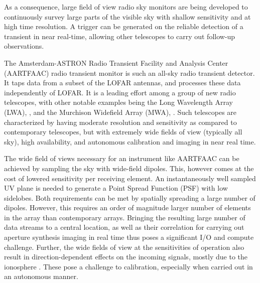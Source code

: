 \documentclass{ws-jai}
\begin{document}
As a consequence, large field of view  radio sky monitors are being developed to
continuously survey large parts of the  visible sky with shallow sensitivity and
at high time  resolution.  A trigger can be generated  on the reliable detection
of  a transient  in  near  real-time, allowing  other  telescopes  to carry  out
follow-up observations.


The  Amsterdam-ASTRON Radio  Transient Facility  and Analysis  Center (AARTFAAC)
radio transient  monitor is such  an all-sky  radio transient detector.  It taps
data from a subset of the LOFAR antennas, and processes these data independently
of LOFAR.  It  is a leading effort  among a group of new  radio telescopes, with
other   notable    examples   being    the   Long   Wavelength    Array   (LWA),
\cite{ellingsonLWA1},   and  the   Murchison   Widefield   Array  (MWA),   \cite
     {tingay2013murchison}.   Such   telescopes  are  characterized   by  having
     moderate resolution and sensitivity as compared to contemporary telescopes,
     but  with  extremely  wide  fields   of  view  (typically  all  sky),  high
     availability, and autonomous calibration and imaging in near real time.

The  wide field  of  views necessary  for  an instrument  like  AARTFAAC can  be
achieved by sampling the sky with wide-field dipoles. This, however comes at the
cost  of lowered  sensitivity per  receiving element.   An instantaneously  well
sampled UV plane  is needed to generate  a Point Spread Function  (PSF) with low
sidelobes.  Both requirements  can be met by spatially spreading  a large number
of  dipoles.  However,  this requires  an order  of magnitude  larger number  of
elements in  the array than  contemporary arrays.  Bringing the  resulting large
number of data streams  to a central location, as well  as their correlation for
carrying out  aperture synthesis imaging in  real time thus poses  a significant
I/O and compute challenge. Further, the wide fields of view at the sensitivities
of operation also result in direction-dependent effects on the incoming signals,
mostly              due              to              the              ionosphere
\citep{intema2009ionospheric,wijnholds2010calibration}.  These  pose a challenge
to calibration, especially when carried out in an autonomous manner.
\end{document}
